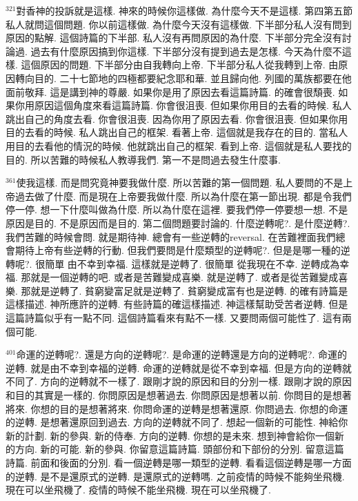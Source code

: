 \documentclass{book}
\begin{document}
$^{321}$對香神的投訴就是這樣.
神來的時候你這樣做.
為什麼今天不是這樣.
第四第五節私人就問這個問題.
你以前這樣做.
為什麼今天沒有這樣做.
下半部分私人沒有問到原因的點解.
這個詩篇的下半部.
私人沒有再問原因的為什麼.
下半部分完全沒有討論過.
過去有什麼原因搞到你這樣.
下半部分沒有提到過去是怎樣.
今天為什麼不這樣.
這個原因的問題.
下半部分由自我轉向上帝.
下半部分私人從我轉到上帝.
由原因轉向目的.
二十七節地的四極都要紀念耶和華.
並且歸向他.
列國的萬族都要在他面前敬拜.
這是講到神的尊嚴.
如果你是用了原因去看這篇詩篇.
的確會很頹喪.
如果你用原因這個角度來看這篇詩篇.
你會很沮喪.
但如果你用目的去看的時候.
私人跳出自己的角度去看.
你會很沮喪.
因為你用了原因去看.
你會很沮喪.
但如果你用目的去看的時候.
私人跳出自己的框架.
看著上帝.
這個就是我存在的目的.
當私人用目的去看他的情況的時候.
他就跳出自己的框架.
看到上帝.
這個就是私人要找的目的.
所以苦難的時候私人教導我們.
第一不是問過去發生什麼事.

$^{361}$使我這樣.
而是問究竟神要我做什麼.
所以苦難的第一個問題.
私人要問的不是上帝過去做了什麼.
而是現在上帝要我做什麼.
所以為什麼在第一節出現.
都是令我們停一停.
想一下什麼叫做為什麼.
所以為什麼在這裡.
要我們停一停要想一想.
不是原因是目的.
不是原因而是目的.
第二個問題要討論的.
什麼逆轉呢?.
是什麼逆轉?.
我們苦難的時候會問.
就是期待神.
總會有一些逆轉的reversal.
在苦難裡面我們總會期待上帝有些逆轉的行動.
但我們要問是什麼類型的逆轉呢?.
但是是哪一種的逆轉呢?.
很簡單 由不幸到幸福.
這樣就是逆轉了.
很簡單 從我現在不幸.
逆轉成為幸福.
那就是一個逆轉的吧.
或者是苦難變成喜樂.
就是逆轉了.
或者是從苦難變成喜樂.
那就是逆轉了.
貧窮變富足就是逆轉了.
貧窮變成富有也是逆轉.
的確有詩篇是這樣描述.
神所應許的逆轉.
有些詩篇的確這樣描述.
神這樣幫助受苦者逆轉.
但是這篇詩篇似乎有一點不同.
這個詩篇看來有點不一樣.
又要問兩個可能性了.
這有兩個可能.

$^{401}$命運的逆轉呢?.
還是方向的逆轉呢?.
是命運的逆轉還是方向的逆轉呢?.
命運的逆轉.
就是由不幸到幸福的逆轉.
命運的逆轉就是從不幸到幸福.
但是方向的逆轉就不同了.
方向的逆轉就不一樣了.
跟剛才說的原因和目的分別一樣.
跟剛才說的原因和目的其實是一樣的.
你問原因是想著過去.
你問原因是想著以前.
你問目的是想著將來.
你想的目的是想著將來.
你問命運的逆轉是想著還原.
你問過去.
你想的命運的逆轉.
是想著還原回到過去.
方向的逆轉就不同了.
想起一個新的可能性.
神給你新的計劃.
新的參與.
新的侍奉.
方向的逆轉.
你想的是未來.
想到神會給你一個新的方向.
新的可能.
新的參與.
你留意這篇詩篇.
頭部份和下部份的分別.
留意這篇詩篇.
前面和後面的分別.
看一個逆轉是哪一類型的逆轉.
看看這個逆轉是哪一方面的逆轉.
是不是還原式的逆轉.
是還原式的逆轉嗎.
之前疫情的時候不能夠坐飛機.
現在可以坐飛機了.
疫情的時候不能坐飛機.
現在可以坐飛機了.
\end{document}
